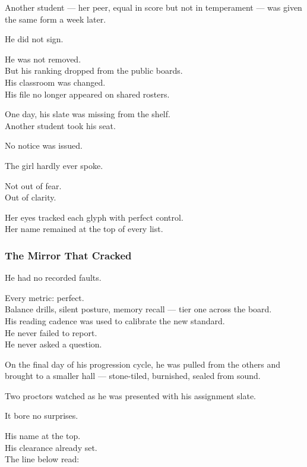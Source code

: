 \documentclass[12pt]{article}
\begin{document}
\vspace{1em}

Another student — her peer, equal in score but not in temperament — was given the same form a week later.

He did not sign.

He was not removed.\\
But his ranking dropped from the public boards.\\
His classroom was changed.\\
His file no longer appeared on shared rosters.

One day, his slate was missing from the shelf.\\
Another student took his seat.

No notice was issued.

\vspace{1em}

The girl hardly ever spoke.

Not out of fear.\\
Out of clarity.

Her eyes tracked each glyph with perfect control.\\
Her name remained at the top of every list.

\dotfill

\subsubsection*{The Mirror That Cracked}

He had no recorded faults.

Every metric: perfect.\\
Balance drills, silent posture, memory recall — tier one across the board.\\
His reading cadence was used to calibrate the new standard.\\
He never failed to report.\\
He never asked a question.

\vspace{1em}

On the final day of his progression cycle, he was pulled from the others and brought to a smaller hall — stone-tiled, burnished, sealed from sound.

Two proctors watched as he was presented with his assignment slate.

It bore no surprises.

His name at the top.\\
His clearance already set.\\
The line below read:
\end{document}
